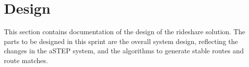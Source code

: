 \section{Design}
This section contains documentation of the design of the rideshare solution.
The parts to be designed in this sprint are the overall system design, reflecting the changes in the aSTEP system, and the algorithms to generate stable routes and route matches.





